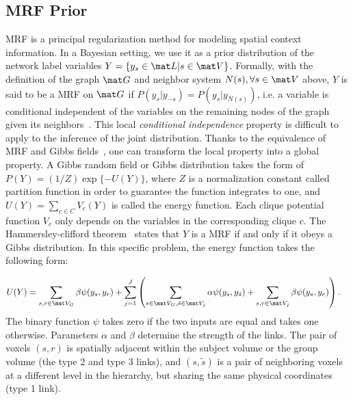 \documentclass[review,authoryear]{elsarticle}
\begin{document}
\subsection{MRF Prior}
\label{sec:mrfprior}
MRF is a principal regularization method for modeling spatial context
information. In a Bayesian setting, we use it as a prior distribution of the
network label variables $Y = \{y_s \in \mat L| s\in \mat V \}$. Formally, with
the definition of the graph $\mat G$ and neighbor system $N(s), \forall s \in
\mat V$ above, $Y$ is said to be a MRF on $\mat G$ if $P(y_s | y_{-s}) = P(y_s |
y_{N(s)})$, i.e. a variable is conditional independent of the variables on the
remaining nodes of the graph given its neighbors~\citep{li1995markov}. This
local \emph{conditional independence} property is difficult to apply to the
inference of the joint distribution. Thanks to the equivalence of MRF and Gibbs
fields~\citep{besag_spatial_1974}, one can transform the local property into a
global property. A Gibbs random field or Gibbs distribution takes the form of
$P(Y) = (1/Z) \exp\{ -U(Y)\}$, where $Z$ is a normalization constant called
partition function in order to guarantee the function integrates to one, and
$U(Y) = \sum_{c\in C} V_c(Y)$ is called the energy function. Each clique
potential function $V_c$ only depends on the variables in the corresponding
clique $c$. The Hammersley-clifford theorem~\citep{hammersley1968markov} states
that $Y$ is a MRF if and only if it obeys a Gibbs distribution. In this
specific problem, the energy function takes the following form:

\begin{align}
  U(Y) &= \sum_{s,r\in\mat V_G} \beta \psi(y_s, y_r) + \sum_{j=1}^J \left ( \sum_{s\in\mat V_G, \tilde s\in\mat V_j} \alpha \psi(y_s, y_{\tilde s}) + \sum_{s,r\in\mat V_j}\beta\psi(y_s, y_r) \right ).\label{eq:energy}
\end{align}
The binary function $\psi$ takes zero if the two inputs are equal and takes one
otherwise. Parameters $\alpha$ and $\beta$ determine the strength of the
links. The pair of voxels $(s, r)$ is spatially adjacent within the subject
volume or the group volume (the type 2 and type 3 links), and $(s, \tilde s)$ is
a pair of neighboring voxels at a different level in the hierarchy, but sharing
the same physical coordinates (type 1 link).
\end{document}
